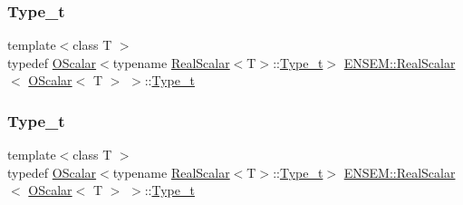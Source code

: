 \subsubsection{\texorpdfstring{Type\_t}{Type\_t}\hspace{0.1cm}{\footnotesize\ttfamily [1/3]}}
{\footnotesize\ttfamily template$<$class T $>$ \\
typedef \mbox{\hyperlink{classENSEM_1_1OScalar}{O\+Scalar}}$<$typename \mbox{\hyperlink{structENSEM_1_1RealScalar}{Real\+Scalar}}$<$T$>$\+::\mbox{\hyperlink{structENSEM_1_1RealScalar_3_01OScalar_3_01T_01_4_01_4_a6c39297bc962beb39d2b33a9cdf329dd}{Type\+\_\+t}}$>$ \mbox{\hyperlink{structENSEM_1_1RealScalar}{E\+N\+S\+E\+M\+::\+Real\+Scalar}}$<$ \mbox{\hyperlink{classENSEM_1_1OScalar}{O\+Scalar}}$<$ T $>$ $>$\+::\mbox{\hyperlink{structENSEM_1_1RealScalar_3_01OScalar_3_01T_01_4_01_4_a6c39297bc962beb39d2b33a9cdf329dd}{Type\+\_\+t}}}

\mbox{\label{structENSEM_1_1RealScalar_3_01OScalar_3_01T_01_4_01_4_a6c39297bc962beb39d2b33a9cdf329dd}} 
\subsubsection{\texorpdfstring{Type\_t}{Type\_t}\hspace{0.1cm}{\footnotesize\ttfamily [2/3]}}
{\footnotesize\ttfamily template$<$class T $>$ \\
typedef \mbox{\hyperlink{classENSEM_1_1OScalar}{O\+Scalar}}$<$typename \mbox{\hyperlink{structENSEM_1_1RealScalar}{Real\+Scalar}}$<$T$>$\+::\mbox{\hyperlink{structENSEM_1_1RealScalar_3_01OScalar_3_01T_01_4_01_4_a6c39297bc962beb39d2b33a9cdf329dd}{Type\+\_\+t}}$>$ \mbox{\hyperlink{structENSEM_1_1RealScalar}{E\+N\+S\+E\+M\+::\+Real\+Scalar}}$<$ \mbox{\hyperlink{classENSEM_1_1OScalar}{O\+Scalar}}$<$ T $>$ $>$\+::\mbox{\hyperlink{structENSEM_1_1RealScalar_3_01OScalar_3_01T_01_4_01_4_a6c39297bc962beb39d2b33a9cdf329dd}{Type\+\_\+t}}}

\mbox{\label{structENSEM_1_1RealScalar_3_01OScalar_3_01T_01_4_01_4_a6c39297bc962beb39d2b33a9cdf329dd}} 
